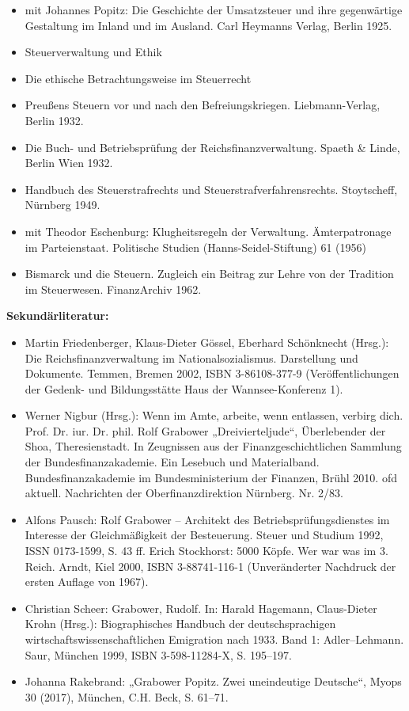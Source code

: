 \documentclass[a4paper]{article}
\begin{document}
\begin{itemize}
\item mit Johannes Popitz: Die Geschichte der Umsatzsteuer und ihre gegenwärtige Gestaltung im Inland und im Ausland.
Carl Heymanns Verlag, Berlin 1925.  
\item Steuerverwaltung und Ethik  
\item Die ethische Betrachtungsweise im Steuerrecht  
\item Preußens Steuern vor und nach den Befreiungskriegen. Liebmann-Verlag, Berlin 1932.  
\item Die Buch- und Betriebsprüfung der Reichsfinanzverwaltung. Spaeth \& Linde, Berlin Wien 1932.  
\item Handbuch des Steuerstrafrechts und Steuerstrafverfahrensrechts. Stoytscheff, Nürnberg 1949.  
\item mit Theodor Eschenburg: Klugheitsregeln der Verwaltung. Ämterpatronage im Parteienstaat. Politische Studien
(Hanns-Seidel-Stiftung) 61 (1956)  
\item Bismarck und die Steuern. Zugleich ein Beitrag zur Lehre von der Tradition im Steuerwesen. FinanzArchiv 1962.
\end{itemize}

\bigskip

\textbf{Sekundärliteratur:}

\begin{itemize}
\item Martin Friedenberger, Klaus-Dieter Gössel, Eberhard Schönknecht (Hrsg.): Die Reichsfinanzverwaltung im
Nationalsozialismus. Darstellung und Dokumente. Temmen, Bremen 2002, ISBN 3-86108-377-9 (Veröffentlichungen der Gedenk-
und Bildungsstätte Haus der Wannsee-Konferenz 1).  
\item Werner Nigbur (Hrsg.): Wenn im Amte, arbeite, wenn entlassen, verbirg dich. Prof. Dr. iur. Dr. phil. Rolf Grabower
„Dreivierteljude“, Überlebender der Shoa, Theresienstadt. In Zeugnissen aus der Finanzgeschichtlichen Sammlung der
Bundesfinanzakademie. Ein Lesebuch und Materialband. Bundesfinanzakademie im Bundesministerium der Finanzen, Brühl
2010.  ofd aktuell. Nachrichten der Oberfinanzdirektion Nürnberg. Nr. 2/83.  
\item Alfons Pausch: Rolf Grabower – Architekt des Betriebsprüfungsdienstes im Interesse der Gleichmäßigkeit der
Besteuerung. Steuer und Studium 1992, ISSN 0173-1599, S. 43 ff.  Erich Stockhorst: 5000 Köpfe. Wer war was im 3. Reich.
Arndt, Kiel 2000, ISBN 3-88741-116-1 (Unveränderter Nachdruck der ersten Auflage von 1967).  
\item Christian Scheer: Grabower, Rudolf. In: Harald Hagemann, Claus-Dieter Krohn (Hrsg.): Biographisches Handbuch der
deutschsprachigen wirtschaftswissenschaftlichen Emigration nach 1933. Band 1: Adler–Lehmann. Saur, München 1999, ISBN
3-598-11284-X, S. 195–197.  
\item Johanna Rakebrand: „Grabower {\textbar} Popitz. Zwei uneindeutige Deutsche“, Myops 30 (2017), München, C.H. Beck,
S. 61–71.
\end{itemize}
\end{document}
